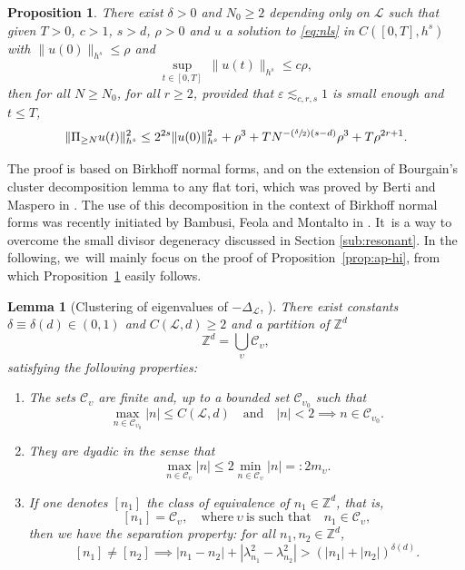 \documentclass[JEP,XML,SOM,Unicode,published]{cedram}
\newcommand{\Psfrac}[2]{(\sfrac{#1}{#2})}
\theoremstyle{plain}
\newtheorem{proposition}[theorem]{Proposition}
\newtheorem{lemma}[theorem]{Lemma}
\theoremstyle{definition}
\newcommand{\Z}{\mathbb{Z}}
\newcommand{\1}{\mathbf{1}}
\begin{document}
\begin{proposition}
\label{prop:high_modes} There exist $\delta >0$ and $N_0\geq 2$ depending only on $\mathscr{L}$ such that given $T>0$, $c>1$, $s>d$, $\rho>0$ and $u$ a solution to \eqref{eq:nls} in $C([0,T],h^{s})$ with $\|u(0)\|_{h^{s}} \leq \rho$ and
\begin{equation}
\label{eq:as-ap}
\underset{t\in[0,T]}{\sup}\ \|u(t)\|_{h^{s}}\leq c\rho,
\end{equation}
then for all $N\geq N_0$, for all $r\geq2$, provided that $\varepsilon \lesssim_{c,r,s} 1$ is small enough and $t\leq T$,
\[
\| \Pi_{\geq N} u(t) \|_{h^s}^2 \leq 2^{2s} \| u(0) \|_{h^s}^2 + \rho^3 + TN^{-\Psfrac{\delta}{2}(s-d)} \rho^{3}+T \rho^{2r+1}.
\]
\end{proposition}

The proof is based on Birkhoff normal forms, and on the extension of Bourgain's cluster decomposition lemma \cite{Bou98} to any flat tori, which was proved by Berti and Maspero in \cite[Th.\,2.1]{Berti-Maspero-19}. The use of this decomposition in the context of Birkhoff normal forms was recently initiated by Bambusi, Feola and Montalto in \cite{BFM22}. It~is a way to overcome the small divisor degeneracy discussed in Section \ref{sub:resonant}. In the following, we~will mainly focus on the proof of Proposition~\ref{prop:ap-hi}, from which Proposition~\ref{prop:high_modes} easily follows.

\begin{lemma}[Clustering of eigenvalues of $-\Delta_\mathscr{L}$, {\cite[Th.\,2.1]{Berti-Maspero-19}}]
\label{lem:cluster}
There exist constants $\delta \equiv \delta(d) \in (0,1)$ and $C(\mathscr{L},d)\geq 2$ and a partition of $\Z^d$
\[
\Z^d = \bigcup_{\upsilon }\mathscr{C}_\upsilon,
\]
satisfying the following properties:
\begin{enumerate}
\item The sets $\mathscr{C}_\upsilon$ are finite and, up to a bounded set $\mathscr{C}_{\upsilon_0}$ such that
\[
\underset{n\in \mathscr{C}_{\upsilon_0}}{\max} |n| \leq C(\mathscr{L},d) \quad \mathrm{and} \quad |n| < 2 \implies n\in \mathscr{C}_{\upsilon_0}.
\]
\item They are dyadic in the sense that
\begin{equation}
\label{eq:dydy}
\underset{n\in\mathscr{C}_{{\upsilon}}}{\max} |n| \leq 2\underset{n\in\mathscr{C}_{{\upsilon}}}{\min} |n| =: 2m_\upsilon.
\end{equation}
\item If one denotes $[n_1]$ the class of equivalence of $n_1\in\Z^d$, that is,
\[
[n_1] = \mathscr{C}_\upsilon,\quad \text{where}\ \upsilon\ \text{is such that}\quad n_1\in\mathscr{C}_\upsilon,
\]
then we have the separation property: for all $n_1,n_2\in\Z^d$,
\[
[n_1]\neq[n_2]\implies |n_1-n_2| + |\lambda_{n_{1}}^{2}-\lambda_{n_{2}}^{2}| > (|n_1|+|n_2|)^{\delta(d)}.
\]
\end{enumerate}
\end{lemma}
\end{document}
